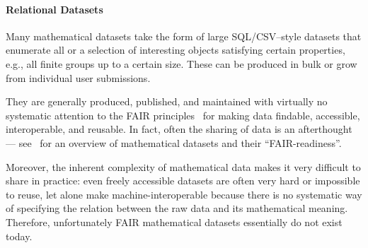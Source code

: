 \paragraph{Relational Datasets}
Many mathematical datasets take the form of large SQL/CSV--style datasets that enumerate all or a selection of interesting objects satisfying certain properties, e.g., all finite groups up to a certain size.
These can be produced in bulk or grow from individual user submissions.

They are generally produced, published, and maintained with virtually no systematic attention to the FAIR principles~\cite{FAIR,WilDumAal:FAIR16} for making data findable, accessible, interoperable, and reusable.
In fact, often the sharing of data is an afterthought --- see~\cite{Bercic:cmo:wiki} for an overview of mathematical datasets and their ``FAIR-readiness''.

Moreover, the inherent complexity of mathematical data makes it very difficult to share in practice: even freely accessible datasets are often very hard or impossible to reuse, let alone make machine-interoperable because there is no systematic way of specifying the relation between the raw data and its mathematical meaning. 
Therefore, unfortunately FAIR mathematical datasets essentially do not exist today.



